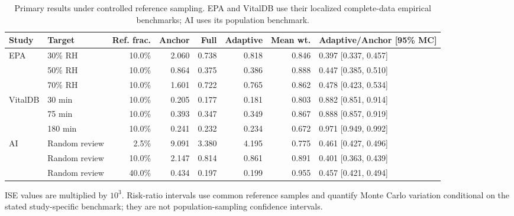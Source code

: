 \begin{table}[!t]
\centering
\footnotesize
\setlength{\tabcolsep}{2.5pt}
\caption{Primary results under controlled reference sampling. EPA and VitalDB use their localized complete-data empirical benchmarks; AI uses its population benchmark.}
\label{tab:application-primary}
\begin{tabular}{llrrrrrl}
\toprule
Study & Target & Ref. frac. & Anchor & Full & Adaptive & Mean wt. & Adaptive/Anchor [95\% MC] \\
\midrule
EPA & 30\% RH & 10.0\% & 2.060 & 0.738 & 0.818 & 0.846 & 0.397 [0.337, 0.457] \\
 & 50\% RH & 10.0\% & 0.864 & 0.375 & 0.386 & 0.888 & 0.447 [0.385, 0.510] \\
 & 70\% RH & 10.0\% & 1.601 & 0.722 & 0.765 & 0.862 & 0.478 [0.423, 0.534] \\
VitalDB & 30 min & 10.0\% & 0.205 & 0.177 & 0.181 & 0.803 & 0.882 [0.851, 0.914] \\
 & 75 min & 10.0\% & 0.393 & 0.347 & 0.349 & 0.867 & 0.888 [0.857, 0.919] \\
 & 180 min & 10.0\% & 0.241 & 0.232 & 0.234 & 0.672 & 0.971 [0.949, 0.992] \\
AI & Random review & 2.5\% & 9.091 & 3.380 & 4.195 & 0.775 & 0.461 [0.427, 0.496] \\
 & Random review & 10.0\% & 2.147 & 0.814 & 0.861 & 0.891 & 0.401 [0.363, 0.439] \\
 & Random review & 40.0\% & 0.434 & 0.197 & 0.199 & 0.955 & 0.457 [0.421, 0.494] \\
\bottomrule
\end{tabular}
\vspace{2pt}
\parbox{0.98\textwidth}{\footnotesize ISE values are multiplied by $10^3$. Risk-ratio intervals use common reference samples and quantify Monte Carlo variation conditional on the stated study-specific benchmark; they are not population-sampling confidence intervals.}
\end{table}
